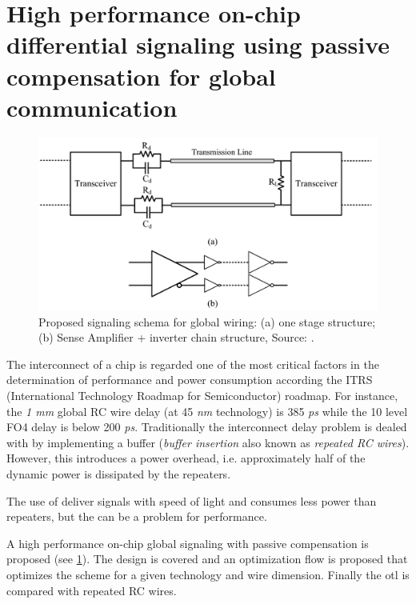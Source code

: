
\section{High performance on-chip differential signaling using passive compensation for global communication \cite{zhang2009high}} \label{ss:zhang2009high}

\begin{figure}	\centering
	\includegraphics[width=0.95\linewidth]{Figures/Rep3Overview.png}
	\caption{Proposed signaling schema for global wiring: (a) one stage structure; (b) Sense Amplifier + inverter chain structure, Source: \cite{zhang2009high}.} 
    \label{fig:rep3:overview}
\end{figure}

The interconnect of a chip is regarded one of the most critical factors in the determination of performance and power consumption according the ITRS (International Technology Roadmap for Semiconductor) roadmap.
For instance, the \textit{1 mm} global RC wire delay (at 45 \textit{nm} technology) is 385 \textit{ps} while the 10 level FO4 delay is below 200 \textit{ps}.
Traditionally the interconnect delay problem is dealed with by implementing a buffer (\textit{buffer insertion} also known as \textit{repeated RC wires}).
However, this introduces a power overhead, i.e. approximately half of the dynamic power is dissipated by the repeaters.

\motive
The use of  deliver signals with speed of light and consumes less power than repeaters, but the  can be a problem for performance.

\objective
A high performance on-chip global signaling with passive compensation is proposed (see \cref{fig:rep3:overview}).
The design is covered and an optimization flow is proposed that optimizes the scheme for a given technology and wire dimension.
Finally the \ac{otl} is compared with repeated RC wires.

